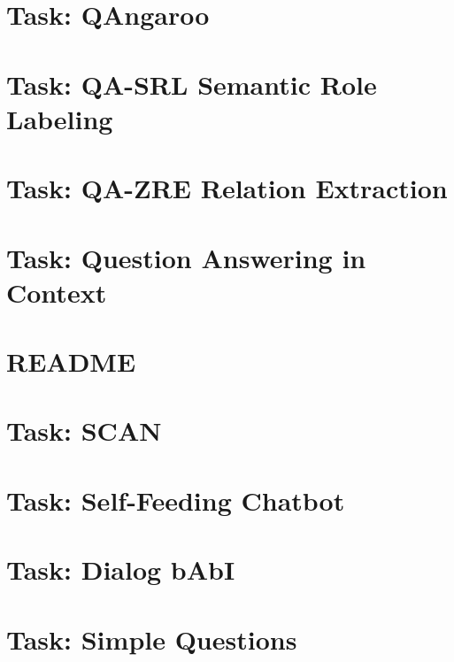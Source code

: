 \documentclass[twoside]{book}
\newcommand{\+}{\discretionary{\mbox{\scriptsize$\hookleftarrow$}}{}{}}
\begin{document}
\chapter{Task\+: Q\+Angaroo}
\label{md_parlai_tasks_qangaroo_README}

\chapter{Task\+: Q\+A-\/\+S\+RL Semantic Role Labeling}
\label{md_parlai_tasks_qasrl_README}

\chapter{Task\+: Q\+A-\/\+Z\+RE Relation Extraction}
\label{md_parlai_tasks_qazre_README}

\chapter{Task\+: Question Answering in Context}
\label{md_parlai_tasks_quac_README}

\chapter{R\+E\+A\+D\+ME}
\label{md_parlai_tasks_README}

\chapter{Task\+: S\+C\+AN}
\label{md_parlai_tasks_scan_README}

\chapter{Task\+: Self-\/\+Feeding Chatbot}
\label{md_parlai_tasks_self_feeding_README}

\chapter{Task\+: Dialog b\+AbI}
\label{md_parlai_tasks_shadock_README}

\chapter{Task\+: Simple Questions}
\label{md_parlai_tasks_simplequestions_README}

\end{document}
